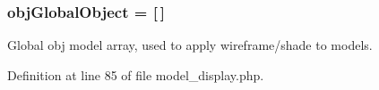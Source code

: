 \hypertarget{model__display_8php_ac5a54459373100893f6d7cda55df4463}{
\subsubsection[{obj\-Global\-Object}]{\setlength{\rightskip}{0pt plus 5cm}obj\-Global\-Object = \mbox{[}$\,$\mbox{]}}}\label{model__display_8php_ac5a54459373100893f6d7cda55df4463}
Global obj model array, used to apply wireframe/shade to models. 

Definition at line 85 of file model\-\_\-display.\-php.

